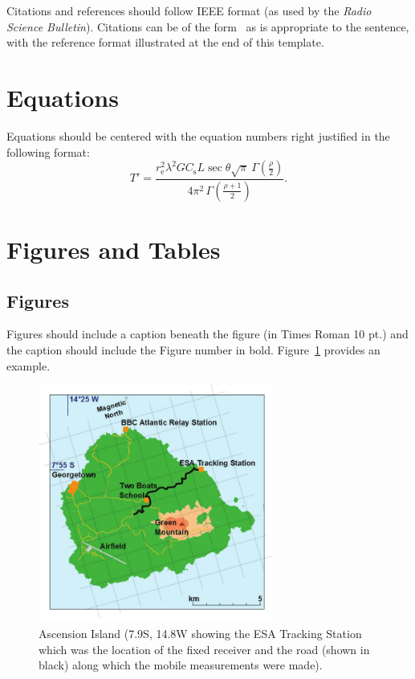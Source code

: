 \documentclass[spc]{ursi}
\begin{document}
Citations and references should follow IEEE format (as used by the
\emph{Radio Science Bulletin}).  Citations can be of the
form~\cite{cannon,mannix} as is appropriate to the sentence, with the
reference format illustrated at the end of this template.

\section{Equations}

Equations should be centered with the equation numbers right justified in
the following format:
\begin{equation}
  \label{eq:T}
  T' = \frac{r_\text{e}^2\lambda^2GC_\text{s}L
    \sec\theta\sqrt{\pi}\ \Gamma\!\left(\frac\rho2\right)}
  {4\pi^2\,\Gamma\!\left(\frac{\rho+1}{2}\right)}.
\end{equation}


\section{Figures and Tables}

\subsection{Figures}

Figures should include a caption beneath the figure (in Times Roman 10 pt.)
and the caption should include the Figure number in
bold. Figure~\ref{fig:asc} provides an example.

\begin{figure}[tbp]
  \centering
  \includegraphics[width=77mm]{ascension_island}
  \caption{Ascension Island (7.9\textdegree S, 14.8\textdegree W showing
    the ESA Tracking Station which was the location of the fixed receiver
    and the road (shown in black) along which the mobile measurements were
    made).}
  \label{fig:asc}
\end{figure}
\end{document}

